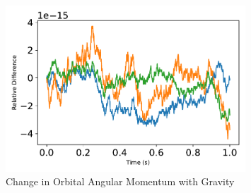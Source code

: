 \begin{figure}[htbp]\centerline{\includegraphics[width=0.8\textwidth]{AutoTeX/ChangeInOrbitalAngularMomentumSystem}}\caption{Change in Orbital Angular Momentum with Gravity}\label{fig:ChangeInOrbitalAngularMomentumSystem}\end{figure}